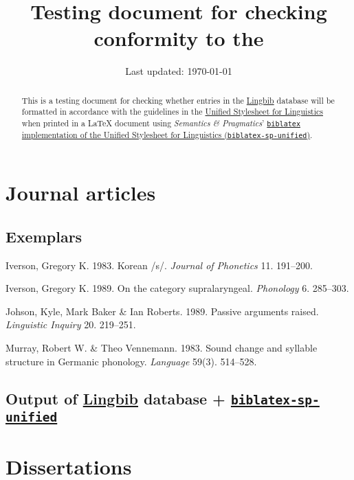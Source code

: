 \documentclass{article}
\title{Testing document for checking conformity to the \UnifiedStyleSheet}
\author{\Lingbib}
\date{Last updated: \today}
\newcommand*{\Lingbib}{\href{http://lingbib.org/}{Lingbib}}
\newcommand*{\SP}{\emph{Semantics \& Pragmatics}}
\newcommand*{\UnifiedStyleSheet}{\href{http://celxj.org/downloads/UnifiedStyleSheet.pdf}{Unified Stylesheet for Linguistics}}
\newcommand*{\SPUnified}{\href{https://github.com/semprag/biblatex-sp-unified/}{\Package{biblatex-sp-unified}}}
\newcommand*{\Package}[1]{\texttt{#1}}
\begin{document}
\maketitle

\begin{abstract}
This is a testing document for checking whether entries in the \Lingbib{} database will be formatted in accordance with the guidelines in the \UnifiedStyleSheet{} when printed in a \LaTeX{} document using  \SP' \href{https://github.com/semprag/biblatex-sp-unified/}{\Package{biblatex} implementation of the Unified Stylesheet for Linguistics (\Package{biblatex-sp-unified})}.
\end{abstract}

\section{Journal articles}

\subsection{Exemplars}

\begin{hangparas}{15pt}{1}

Iverson, Gregory K. 1983. Korean /s/. \textit{Journal of Phonetics} 11. 191--200.

Iverson, Gregory K. 1989. On the category supralaryngeal. \textit{Phonology} 6. 285--303.

Johson, Kyle, Mark Baker \& Ian Roberts. 1989. Passive arguments raised. \textit{Linguistic Inquiry} 20. 219--251.

Murray, Robert W. \& Theo Vennemann. 1983. Sound change and syllable structure in Germanic phonology. \textit{Language} 59(3). 514--528.

\end{hangparas}

\subsection{Output of \Lingbib{} database + \SPUnified}

\nocite{chomsky2013:projection}

\printbibliography[
	heading=none
]

\section{Dissertations}
\end{document}
